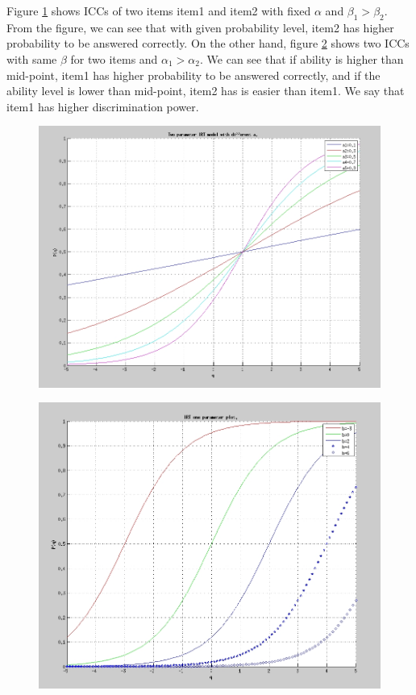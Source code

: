 \documentclass[a4paper]{article}
\begin{document}
Figure \ref{fig:icc_a} shows ICCs of two items item1 and item2 with fixed
$\alpha$ and $\beta_1 > \beta_2$. From the figure, we can see that
with given probability level, item2 has higher probability to be
answered correctly. On the other hand, figure \ref{fig:icc_b} shows two ICCs
with same $\beta$ for two items and $\alpha_1 > \alpha_2$. We can see
that if ability is higher than mid-point, item1 has higher probability
to be answered correctly, and if the ability level is lower than
mid-point, item2 has is easier than item1. We say that item1 has
higher discrimination power. 

\begin{figure}[h]
  \centering
  \includegraphics{IRT-a.jpg} 
  \label{fig:icc_a}
\end{figure}
\begin{figure}
  \centering
  \includegraphics{IRT-b.jpg}
  \label{fig:icc_b}
\end{figure}
\end{document}
